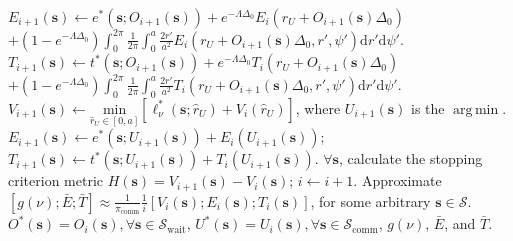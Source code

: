 \documentclass[12pt, draftcls, onecolumn]{IEEEtran}
\theoremstyle{plain}
\theoremstyle{definition}
\theoremstyle{remark}
\DeclareMathOperator*{\argmin}{arg\,min}
\begin{document}
\begin{algorithm}[t]
\begin{algorithmic}[1]
        		\State $E_{i{+}1}(\mathbf{s}){\gets}e^{*}(\mathbf{s};O_{i{+}1}(\mathbf{s})){+}e^{-\Lambda\Delta_{0}}E_{i}(r_{U}{+}O_{i{+}1}(\mathbf{s})\Delta_{0})$
        		\vspace{.2cm}
        		\Statex \hspace{2.8cm} ${+}\left(1{-}e^{-\Lambda\Delta_{0}}\right)\int_{0}^{2\pi}\frac{1}{2\pi}\int_{0}^{a}\frac{2r'}{a^{2}}E_{i}(r_{U}{+}O_{i{+}1}(\mathbf{s})\Delta_{0},r',\psi')\mathrm{d}r'\mathrm{d}\psi'$.
        		\vspace{.2cm}
        		\State $T_{i{+}1}(\mathbf{s}){\gets}t^{*}(\mathbf{s};O_{i{+}1}(\mathbf{s})){+}e^{-\Lambda\Delta_{0}}T_{i}(r_{U}{+}O_{i{+}1}(\mathbf{s})\Delta_{0})$
        		\vspace{.2cm}
        		\Statex \hspace{2.8cm} ${+}\left(1{-}e^{-\Lambda\Delta_{0}}\right)\int_{0}^{2\pi}\frac{1}{2\pi}\int_{0}^{a}\frac{2r'}{a^{2}}T_{i}(r_{U}{+}O_{i{+}1}(\mathbf{s})\Delta_{0},r',\psi')\mathrm{d}r'\mathrm{d}\psi'$.
        		\vspace{.2cm}
        	\EndFor
        	\vspace{.2cm}
        	    \vspace{.2cm}
        		\State $V_{i{+}1}(\mathbf{s}){\gets}\underset{\hat{r}_{U}{\in}[0,a]}{\mathrm{min}}\left[\ell_{\nu}^{*}(\mathbf{s};\hat{r}_{U}){+}V_{i}(\hat{r}_{U})\right]$, where $U_{i{+}1}(\mathbf{s})$ is the $\argmin$.
        		\vspace{.2cm}
        		\State $E_{i{+}1}(\mathbf{s}){\gets}e^{*}(\mathbf{s};U_{i{+}1}(\mathbf{s})){+}E_{i}(U_{i{+}1}(\mathbf{s}))$;
        		\vspace{.2cm}
        		\State $T_{i{+}1}(\mathbf{s}){\gets}t^{*}(\mathbf{s};U_{i{+}1}(\mathbf{s})){+}T_{i}(U_{i{+}1}(\mathbf{s}))$.
        		\vspace{.2cm}
        	\EndFor
        	\vspace{.2cm}
        	\State ${\forall}\mathbf{s}$, calculate the stopping criterion metric $H(\mathbf{s}){=}V_{i{+}1}(\mathbf{s}){-}V_{i}(\mathbf{s})$; $i{\gets}i{+}1$.
        	\vspace{.2cm}
    \vspace{.2cm}
    \State Approximate $\left[g(\nu);\bar{E};\bar{T}\right]{\approx}\frac{1}{\pi_{\mathrm{comm}}}\frac{1}{i}\left[V_{i}(\mathbf{s});E_{i}(\mathbf{s});T_{i}(\mathbf{s})\right]$, for some arbitrary $\mathbf{s}{\in}\mathcal{S}$.
    \vspace{.2cm}\\
    \Return $O^{*}(\mathbf{s})=O_{i}(\mathbf{s}),{\forall}\mathbf{s}{\in}\mathcal{S}_{\mathrm{wait}}$, $U^{*}(\mathbf{s}){=}U_{i}(\mathbf{s}),{\forall}\mathbf{s}{\in} \mathcal{S}_{\mathrm{comm}}$, $g(\nu)$, $\bar{E}$, and $\bar{T}$.
    \end{algorithmic}
\end{algorithm}
\end{document}
